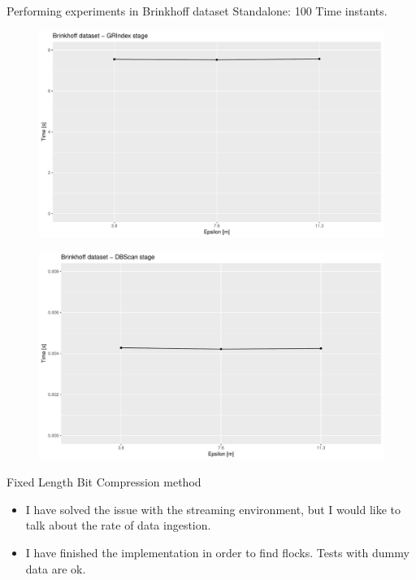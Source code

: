 \documentclass{beamer}
\begin{document}
\begin{frame}{Performing experiments in Brinkhoff dataset}
    {\small Standalone: 100 Time instants.}
    \centering
    \begin{minipage}{.5\textwidth}
        \begin{figure}
            \includegraphics[width=\textwidth]{ICPETesterStandaloneGRIndex}
        \end{figure}   
    \end{minipage}%
    \begin{minipage}{.5\textwidth}
        \begin{figure}
            \includegraphics[width=\textwidth]{ICPETesterStandaloneDBScan}
        \end{figure}   
    \end{minipage}
\end{frame}

\begin{frame}{Fixed Length Bit Compression method}
    \begin{itemize}
        \item I have solved the issue with the streaming environment, but I would like to talk about the rate of data ingestion.
        \item I have finished the implementation in order to find flocks.  Tests with dummy data are ok.
    \end{itemize}
\end{frame}
\end{document}

